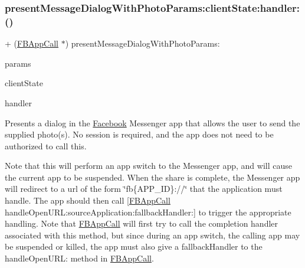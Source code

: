 \subsubsection{\texorpdfstring{present\+Message\+Dialog\+With\+Photo\+Params\+:client\+State\+:handler\+:()}{presentMessageDialogWithPhotoParams:clientState:handler:()}\hspace{0.1cm}{\footnotesize\ttfamily [2/5]}}
{\footnotesize\ttfamily + (\hyperlink{interfaceFBAppCall}{F\+B\+App\+Call} $\ast$) present\+Message\+Dialog\+With\+Photo\+Params\+: \begin{DoxyParamCaption}\item[{(\hyperlink{interfaceFBPhotoParams}{F\+B\+Photo\+Params} $\ast$)}]{params }\item[{clientState:(N\+S\+Dictionary $\ast$)}]{client\+State }\item[{handler:(F\+B\+Dialog\+App\+Call\+Completion\+Handler)}]{handler }\end{DoxyParamCaption}}

Presents a dialog in the \hyperlink{interfaceFacebook}{Facebook} Messenger app that allows the user to send the supplied photo(s). No session is required, and the app does not need to be authorized to call this.

Note that this will perform an app switch to the Messenger app, and will cause the current app to be suspended. When the share is complete, the Messenger app will redirect to a url of the form \char`\"{}fb\{\+A\+P\+P\+\_\+\+I\+D\}\+://\char`\"{} that the application must handle. The app should then call \mbox{[}\hyperlink{interfaceFBAppCall}{F\+B\+App\+Call} handle\+Open\+U\+R\+L\+:source\+Application\+:fallback\+Handler\+:\mbox{]} to trigger the appropriate handling. Note that \hyperlink{interfaceFBAppCall}{F\+B\+App\+Call} will first try to call the completion handler associated with this method, but since during an app switch, the calling app may be suspended or killed, the app must also give a fallback\+Handler to the handle\+Open\+U\+RL\+: method in \hyperlink{interfaceFBAppCall}{F\+B\+App\+Call}.


